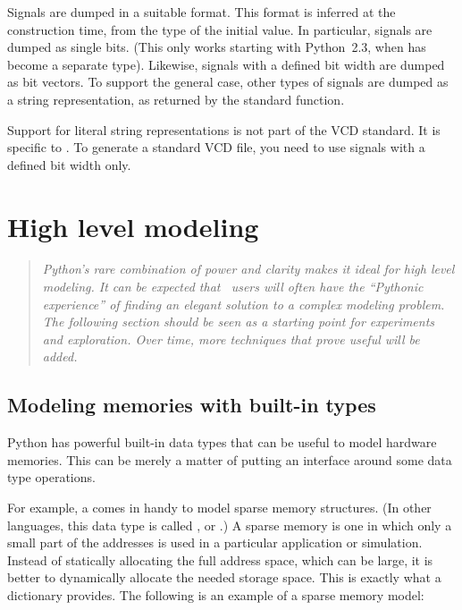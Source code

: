 Signals are dumped in a suitable format. This format is inferred at
the  construction time, from the type of the initial
value. In particular,  signals are dumped as single
bits. (This only works starting with Python~2.3, when  has
become a separate type).  Likewise,  signals with a
defined bit width are dumped as bit vectors. To support the general
case, other types of signals are dumped as a string representation, as
returned by the standard  function.

\begin{notice}[warning]
Support for literal string representations is not part of the VCD
standard. It is specific to . To generate a
standard VCD file, you need to use signals with a defined bit width
only.
\end{notice}


\section{High level modeling \label{model-hl}}

\begin{quote}
\em 
Python's rare combination of power and clarity makes it ideal for high
level modeling. It can be expected that \myhdl\ users will often have the
``Pythonic experience'' of finding an elegant solution to a complex
modeling problem.  The following section should be seen as a starting
point for experiments and exploration. Over time, more techniques that
prove useful will be added.
\end{quote}

\subsection{Modeling memories with built-in types \label{model-mem}}

Python has powerful built-in data types that can be useful to model
hardware memories. This can be merely a matter of putting an interface
around some data type operations.

For example, a  comes in handy to model sparse memory
structures. (In other languages, this data type is called 
, or .) A sparse memory is one in
which only a small part of the addresses is used in a particular
application or simulation. Instead of statically allocating the full
address space, which can be large, it is better to dynamically
allocate the needed storage space. This is exactly what a dictionary
provides. The following is an example of a sparse memory model:

